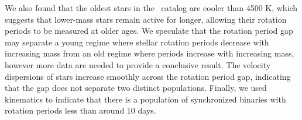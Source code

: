 We also found that the oldest stars in the \mct\ catalog are cooler than 4500
K, which suggests that lower-mass stars remain active for longer, allowing
their rotation periods to be measured at older ages.
We speculate that the rotation period gap \citep{mcquillan2014} may separate
a young regime where stellar rotation periods decrease with increasing mass
from an old regime where periods increase with increasing mass, however more
data are needed to provide a conclusive result.
The velocity dispersions of stars increase smoothly across the rotation period
gap, indicating that the gap does not separate two distinct populations.
Finally, we used kinematics to indicate that there is a population of
synchronized binaries with rotation periods less than around 10 days.


